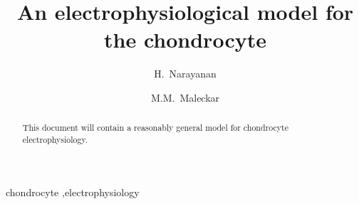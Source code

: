\begin{frontmatter}

\title{An electrophysiological model for the chondrocyte}

\author[srl]{H.~Narayanan}
\author[srl]{M.M.~Maleckar}

\address[srl]{Center for Biomedical Computing, Simula Research
  Laboratory, P.O.~Box~134, 1325~Lysaker, Norway}

\begin{abstract}
  This document will contain a reasonably general model for
  chondrocyte electrophysiology.
\end{abstract}

\begin{keyword}
chondrocyte \sep electrophysiology
\end{keyword}

\end{frontmatter}

